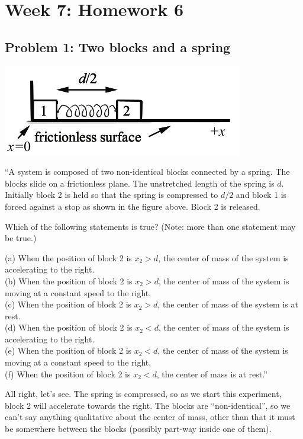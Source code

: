 \documentclass[8.01x]{subfiles}
\begin{document}
\chapter{Week 7: Homework 6}

\section{Problem 1: Two blocks and a spring}

\begin{center}
\includegraphics[scale=0.6]{Graphics/h6p1}
\end{center}

``A system is composed of two non-identical blocks connected by a spring. The blocks slide on a frictionless plane. The unstretched length of the spring is $d$. Initially block 2 is held so that the spring is compressed to $d/2$ and block 1 is forced against a stop as shown in the figure above. Block 2 is released.

Which of the following statements is true? (Note: more than one statement may be true.)

(a) When the position of block 2 is $x_2 > d$, the center of mass of the system is accelerating to the right.\\
(b) When the position of block 2 is $x_2 > d$, the center of mass of the system is moving at a constant speed to the right.\\
(c) When the position of block 2 is $x_2 > d$, the center of mass of the system is at rest.\\
(d) When the position of block 2 is $x_2 < d$, the center of mass of the system is accelerating to the right.\\
(e) When the position of block 2 is $x_2 < d$, the center of mass of the system is moving at a constant speed to the right.\\
(f) When the position of block 2 is $x_2 < d$, the center of mass is at rest.''

All right, let's see. The spring is compressed, so as we start this experiment, block 2 will accelerate towards the right. The blocks are ``non-identical'', so we can't say anything qualitative about the center of mass, other than that it must be somewhere between the blocks (possibly part-way inside one of them).
\end{document}
